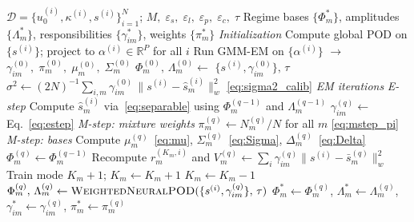 \documentclass{article}
\begin{document}
\begin{algorithm}[H]
\caption{TEMPO --- Offline Phase}
\label{alg:tempo}
\begin{algorithmic}[1]
\Require $\mathcal{D} = \{u_0^{(i)}, \kappa^{(i)}, s^{(i)}\}_{i=1}^N$;\;
  $M,\;\varepsilon_s,\;\varepsilon_l,\;\varepsilon_p,\;\varepsilon_c,\;\tau$
\Ensure Regime bases $\{\Phi_m^*\}$,\;
  amplitudes $\{\Lambda_m^*\}$,\;
  responsibilities $\{\gamma_{im}^*\}$,\;
  weights $\{\pi_m^*\}$
%
\Statex \textit{Initialization}
\State Compute global POD on $\{s^{(i)}\}$;
  project to $\alpha^{(i)} \in \mathbb{R}^P$ for all $i$
\State Run GMM-EM on $\{\alpha^{(i)}\}$ $\to$
  $\gamma_{im}^{(0)},\;\pi_m^{(0)},\;\mu_m^{(0)},\;\Sigma_m^{(0)}$
  \State $\Phi_m^{(0)},\,\Lambda_m^{(0)} \leftarrow$
    {$\{s^{(i)},\gamma_{im}^{(0)}\},\,\tau$}
    \hfill{}
\EndFor
\State $\sigma^2 \leftarrow (2N)^{-1}\!\sum_{i,m}
  \gamma_{im}^{(0)}\,\|s^{(i)}{-}\hat{s}_m^{(i)}\|_w^2$
  \hfill\eqref{eq:sigma2_calib}
%
\Statex \textit{EM iterations}
\Repeat
  \Statex \quad\textit{E-step}
    \State Compute $\hat{s}_m^{(i)}$ via~\eqref{eq:separable}
      using $\Phi_m^{(q-1)}$ and $\Lambda_m^{(q-1)}$
    \State $\gamma_{im}^{(q)} \leftarrow$ Eq.~\eqref{eq:estep}
  \EndFor
  \Statex \quad\textit{M-step: mixture weights}
  \State $\pi_m^{(q)} \leftarrow N_m^{(q)}/N$
    for all $m$ \hfill\eqref{eq:mstep_pi}
  \Statex \quad\textit{M-step: bases}
    \State Compute $\mu_m^{(q)}$~\eqref{eq:mu},\;
      $\Sigma_m^{(q)}$~\eqref{eq:Sigma},\;
      $\Delta_m^{(q)}$~\eqref{eq:Delta}
      \State $\Phi_m^{(q)} \leftarrow \Phi_m^{(q-1)}$ 
      \State Recompute $r_m^{(K_m,i)}$ and $V_m^{(q)} \leftarrow \textstyle\sum_i\gamma_{im}^{(q)}\|s^{(i)}{-}\bar{s}_m^{(q)}\|_w^2$ 
        \State Train mode $K_m{+}1$;\; $K_m \leftarrow K_m + 1$
      \EndIf
        \State $K_m \leftarrow K_m - 1$
      \EndIf
    \Else
      \State $\Phi_m^{(q)},\,\Lambda_m^{(q)} \leftarrow \Call{WeightedNeuralPOD}{\{s^{(i)},\gamma_{im}^{(q)}\},\,\tau}$ 
    \EndIf
  \EndFor
{}
\State \Return $\Phi_m^* \!\leftarrow\! \Phi_m^{(q)}$,\;
  $\Lambda_m^* \!\leftarrow\! \Lambda_m^{(q)}$,\;
  $\gamma_{im}^* \!\leftarrow\! \gamma_{im}^{(q)}$,\;
  $\pi_m^* \!\leftarrow\! \pi_m^{(q)}$
\end{algorithmic}
\end{algorithm}
\end{document}
